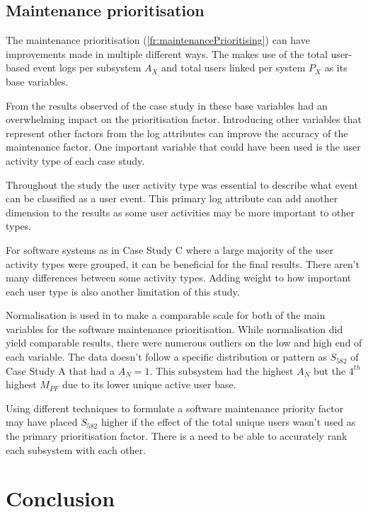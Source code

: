 \subsection{Maintenance prioritisation}
The maintenance prioritisation (\ref{fr:maintenancePrioritising}) can have improvements made in
multiple different ways. The
 makes use
of the total user-based event logs per subsystem $A_X$ and total users linked per system $P_X$ as
its base variables.\par From the results observed of the case study in 
these base variables had an overwhelming impact on the prioritisation factor. Introducing other
variables that represent other factors from the log attributes can improve the accuracy of the
maintenance factor. One important variable that could have been used is the user activity type of
each case study.\par Throughout the study the user activity type was essential to describe what
event can be classified as a user event. This primary log attribute can add another dimension to the
results as some user activities may be more important to other types. \par For software systems as
in Case Study C where a large majority of the user activity types were grouped, it can be beneficial
for the final results. There aren't many differences between some activity types. Adding weight to
how important each user type is also another limitation of this study.\par Normalisation is used in
 to make a
comparable scale for both of the main variables for the software maintenance prioritisation. While
normalisation did yield comparable results, there were numerous outliers on the low and high end of
each variable. The data doesn't follow a specific distribution or pattern as $S_{582}$ of Case Study
A that had a $A_N=1$. This subsystem had the highest $A_N$ but the $4^{th}$ highest $M_{PF}$ due to
its lower unique active user base.\par Using different techniques to formulate a software
maintenance priority factor may have placed $S_{582}$ higher if the effect of the total unique users
wasn't used as the primary prioritisation factor. There is a need to be able to accurately rank each
subsystem with each other.

\section{Conclusion}

